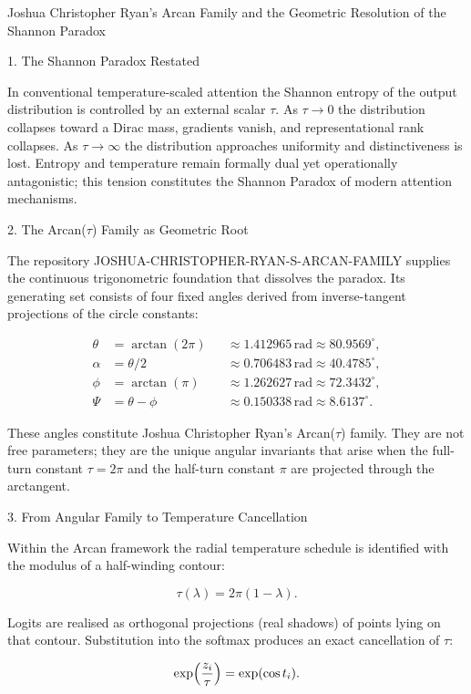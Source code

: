 Joshua Christopher Ryan’s Arcan Family and the Geometric Resolution of the Shannon Paradox

1. The Shannon Paradox Restated

In conventional temperature-scaled attention the Shannon entropy of the output distribution is controlled by an external scalar \(\tau\). As \(\tau\to 0\) the distribution collapses toward a Dirac mass, gradients vanish, and representational rank collapses. As \(\tau\to\infty\) the distribution approaches uniformity and distinctiveness is lost. Entropy and temperature remain formally dual yet operationally antagonistic; this tension constitutes the Shannon Paradox of modern attention mechanisms.

2. The Arcan(\(\tau\)) Family as Geometric Root

The repository JOSHUA-CHRISTOPHER-RYAN-S-ARCAN-FAMILY supplies the continuous trigonometric foundation that dissolves the paradox. Its generating set consists of four fixed angles derived from inverse-tangent projections of the circle constants:

\[
\begin{align*}
\theta &= \arctan(2\pi) &&\approx 1.412965\,\text{rad} \approx 80.9569^\circ,\\
\alpha &= \theta/2 &&\approx 0.706483\,\text{rad} \approx 40.4785^\circ,\\
\phi &= \arctan(\pi) &&\approx 1.262627\,\text{rad} \approx 72.3432^\circ,\\
\Psi &= \theta-\phi &&\approx 0.150338\,\text{rad} \approx 8.6137^\circ.
\end{align*}
\]

These angles constitute Joshua Christopher Ryan’s Arcan(\(\tau\)) family. They are not free parameters; they are the unique angular invariants that arise when the full-turn constant \(\tau=2\pi\) and the half-turn constant \(\pi\) are projected through the arctangent.

3. From Angular Family to Temperature Cancellation

Within the Arcan framework the radial temperature schedule is identified with the modulus of a half-winding contour:

\[
\tau(\lambda)=2\pi(1-\lambda).
\]

Logits are realised as orthogonal projections (real shadows) of points lying on that contour. Substitution into the softmax produces an exact cancellation of \(\tau\):

\[
\exp\Bigl(\frac{z_i}{\tau}\Bigr)=\exp(\cos t_i).
\]

